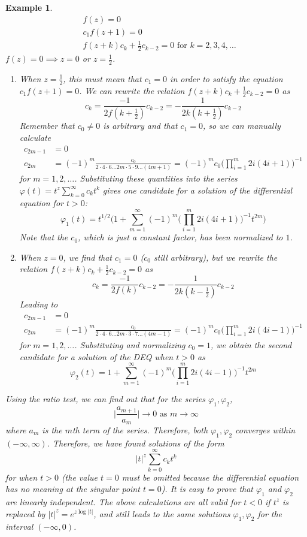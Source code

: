 \documentclass{article}
\newtheorem{example}{Example}[section]
\theoremstyle{remark}
\theoremstyle{definition}
\begin{document}
\begin{example}
\begin{align*}
    &f(z) = 0 \\
    &c_1 f(z+1) = 0 \\
    &f(z+k) c_k + \frac{1}{2} c_{k-2} = 0 \text{ for } k = 2, 3, 4, \ldots 
\end{align*}
$f(z) = 0 \implies z = 0$ or $z = \frac{1}{2}$. 
\begin{enumerate}
    \item When $z = \frac{1}{2}$, this must mean that $c_1 = 0$ in order to satisfy the equation $c_1 f(z+1) = 0$. We can rewrite the relation $f(z+k) c_k + \frac{1}{2} c_{k-2} = 0$ as
    \[c_k = \frac{-1}{2 f(k + \frac{1}{2})} c_{k-2} = -\frac{1}{2k (k+\frac{1}{2})} c_{k-2}\]
    Remember that $c_0 \neq 0$ is arbitrary and that $c_1 = 0$, so we can manually calculate 
    \begin{align*}
        c_{2m-1} & = 0 \\
        c_{2m} & = (-1)^m \frac{c_0}{2 \cdot 4 \cdot 6 \ldots 2m \cdot 5 \cdot 9 \ldots (4m+1)} = (-1)^m c_0 \bigg( \prod_{i=1}^m 2i (4i + 1) \bigg)^{-1}
    \end{align*}
    for $m = 1, 2, \ldots $. Substituting these quantities into the series $\varphi(t) = t^z \sum_{k=0}^\infty c_k t^k$ gives
    one candidate for a solution of the differential equation for $t>0$:
    \[\varphi_1 (t) = t^{1/2} \Bigg( 1 + \sum_{m=1}^\infty (-1)^m \bigg( \prod_{i=1}^m 2i (4i + 1) \bigg)^{-1} t^{2m} \Bigg) \]
    Note that the $c_0$, which is just a constant factor, has been normalized to $1$. 
    \item When $z = 0$, we find that $c_1 = 0$ ($c_0$ still arbitrary), but we rewrite the relation $f(z+k) c_k + \frac{1}{2} c_{k-2} = 0$ as 
    \[c_k = \frac{-1}{2 f(k)} c_{k-2} = -\frac{1}{2k (k-\frac{1}{2})} c_{k-2}\]
    Leading to
    \begin{align*}
        c_{2m-1} & = 0 \\
        c_{2m} & = (-1)^m \frac{c_0}{2 \cdot 4 \cdot 6 \ldots 2m \cdot 3 \cdot 7 \ldots (4m-1)} = (-1)^m c_0 \bigg( \prod_{i=1}^m 2i (4i - 1) \bigg)^{-1}
    \end{align*}
    for $m = 1, 2, \ldots $. Substituting and normalizing $c_0 = 1$, we obtain the second candidate for a solution of the DEQ when $t>0$ as
    \[\varphi_2 (t) = 1 + \sum_{m=1}^\infty (-1)^m \bigg( \prod_{i=1}^m 2i (4i - 1) \bigg)^{-1} t^{2m}\]
\end{enumerate}
Using the ratio test, we can find out that for the series $\varphi_1, \varphi_2$, 
\[\bigg|\frac{a_{m+1}}{a_{m}}\bigg| \rightarrow 0 \text{ as } m \rightarrow \infty\]
where $a_m$ is the $m$th term of the series. Therefore, both $\varphi_1, \varphi_2$ converges within $(-\infty, \infty)$. Therefore, we have found solutions of the form 
\[|t|^z \sum_{k=0}^\infty c_k t^k\]
for when $t>0$ (the value $t=0$ must be omitted because the differential equation has no meaning at the singular point $t=0$). It is easy to prove that $\varphi_1$ and $\varphi_2$ are linearly independent. The above calculations are all valid for $t<0$ if $t^z$ is replaced by $|t|^z = e^{z \log{|t|}}$, and still leads to the same solutions $\varphi_1, \varphi_2$ for the interval $(-\infty, 0)$.
\end{example}
\end{document}
